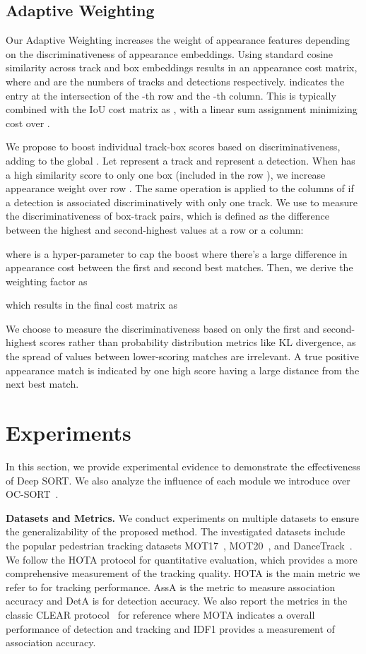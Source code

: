 \documentclass{article}
\begin{document}
\subsection{Adaptive Weighting} 
Our Adaptive Weighting increases the weight of appearance features depending on the discriminativeness of appearance embeddings.  Using standard cosine similarity across track and box embeddings results in an  appearance cost matrix,  where  and  are the numbers of tracks and detections respectively.  indicates the entry at the intersection of the -th row and the -th column. This is typically combined with the IoU cost matrix  as , with a linear sum assignment minimizing cost over . 

We propose to boost individual track-box scores based on discriminativeness, adding  to the global . Let  represent a track and  represent a detection. When  has a high similarity score to only one box (included in the row ), we increase appearance weight over row . The same operation is applied to the columns of  if a detection  is associated discriminatively with only one track. We use  to measure the discriminativeness of box-track pairs, which is defined as the difference between the highest and second-highest values at a row or a column:

where  is a hyper-parameter to cap the boost where there's a large difference in appearance cost between the first and second best matches.
Then, we derive the weighting factor as 

which results in the final cost matrix  as

We choose to measure the discriminativeness based on only the first and second-highest scores rather than probability distribution metrics like KL divergence, as the spread of values between lower-scoring matches are irrelevant. A true positive appearance match is indicated by one high score having a large distance from the next best match. 


\section{Experiments}
\label{sec:experiments}
\vspace{-0.2cm}
In this section, we provide experimental evidence to demonstrate the effectiveness of Deep SORT. We also analyze the influence of each module we introduce over OC-SORT~\cite{cao2022observation}. 

\noindent \textbf{Datasets and Metrics.} We conduct experiments on multiple datasets to ensure the generalizability of the proposed method. The investigated datasets include the popular pedestrian tracking datasets MOT17~\cite{milan2016mot16}, MOT20~\cite{dendorfer2020mot20}, and DanceTrack~\cite{sun2021dancetrack}. We follow the HOTA protocol\cite{luiten2021hota} for quantitative evaluation, which provides a more comprehensive measurement of the tracking quality. HOTA is the main metric we refer to for tracking performance. AssA is the metric to measure association accuracy and DetA is for detection accuracy. We also report the metrics in the classic CLEAR protocol~\cite{clearprotocol} for reference where MOTA indicates a overall performance of detection and tracking and IDF1 provides a measurement of association accuracy. 
\end{document}

